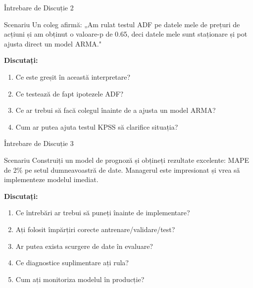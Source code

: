\documentclass[9pt, aspectratio=169, t]{beamer}
\begin{document}
\begin{frame}{Întrebare de Discuție 2}
    \begin{block}{Scenariu}
        Un coleg afirmă: „Am rulat testul ADF pe datele mele de prețuri de acțiuni și am obținut o valoare-p de 0.65, deci datele mele sunt staționare și pot ajusta direct un model ARMA."
    \end{block}

    \vspace{0.4cm}

    \textbf{Discutați:}
    \begin{enumerate}
        \item Ce este greșit în această interpretare?
        \item Ce testează de fapt ipotezele ADF?
        \item Ce ar trebui să facă colegul înainte de a ajusta un model ARMA?
        \item Cum ar putea ajuta testul KPSS să clarifice situația?
    \end{enumerate}
\end{frame}

\begin{frame}{Întrebare de Discuție 3}
    \begin{block}{Scenariu}
        Construiți un model de prognoză și obțineți rezultate excelente: MAPE de 2\% pe setul dumneavoastră de date. Managerul este impresionat și vrea să implementeze modelul imediat.
    \end{block}

    \vspace{0.4cm}

    \textbf{Discutați:}
    \begin{enumerate}
        \item Ce întrebări ar trebui să puneți înainte de implementare?
        \item Ați folosit împărțiri corecte antrenare/validare/test?
        \item Ar putea exista scurgere de date în evaluare?
        \item Ce diagnostice suplimentare ați rula?
        \item Cum ați monitoriza modelul în producție?
    \end{enumerate}
\end{frame}
\end{document}
